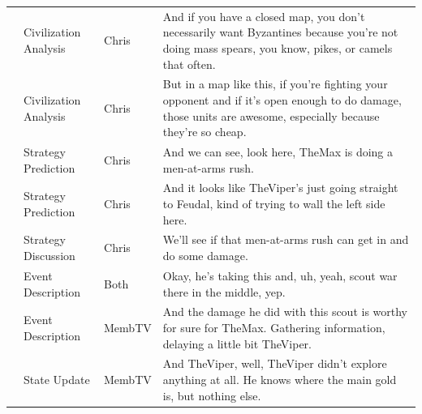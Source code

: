{\begin{longtable}{@{}>{\theAppRow}r|L{2.3cm}L{1.0cm}U{11.55cm}@{}}
    & Civilization Analysis & Chris        & And if you have a closed map, you don't necessarily want Byzantines because you're not doing mass spears, you know, pikes, or camels that often.                                                                                                                 \\
    & Civilization Analysis & Chris        & But in a map like this, if you're fighting your opponent and if it's open enough to do damage, those units are awesome, especially because they're so cheap.                                                                                                     \\
    & Strategy Prediction   & Chris        & And we can see, look here, TheMax is doing a men-at-arms rush.                                                                                                                                                                                                   \\
    & Strategy Prediction   & Chris        & And it looks like TheViper's just going straight to Feudal, kind of trying to wall the left side here.                                                                                                                                                           \\
    & Strategy Discussion   & Chris        & We'll see if that men-at-arms rush can get in and do some damage.                                                                                                                                                                                                \\
    & Event Description     & Both         & Okay, he's taking this and, uh, yeah, scout war there in the middle, yep.                                                                                                                                                                                        \\
    & Event Description     & MembTV       & And the damage he did with this scout is worthy for sure for TheMax. Gathering information, delaying a little bit TheViper.                                                                                                                                      \\
    & State Update          & MembTV       & And TheViper, well, TheViper didn't explore anything at all. He knows where the main gold is, but nothing else.                                                                                                                                                  \\

\end{longtable}}

